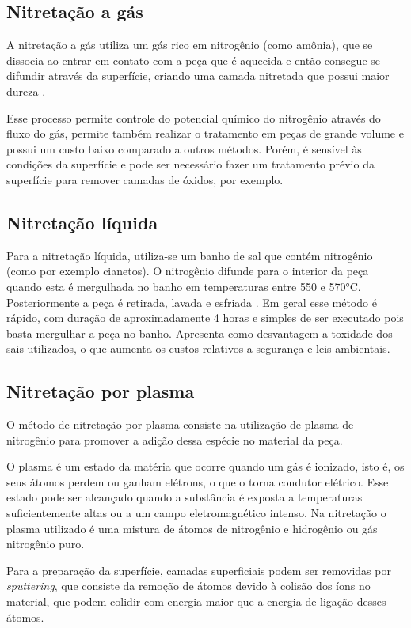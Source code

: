 \documentclass[]{politex}
\begin{document}
\subsection{Nitretação a gás}
	A nitretação a gás utiliza um gás rico em nitrogênio (como amônia), que se dissocia ao entrar em contato com a peça que é aquecida e então consegue se difundir através da superfície, criando uma camada nitretada que possui maior dureza \cite{zimmermannnitretaccao}.   
	
	Esse processo permite controle do potencial químico do nitrogênio através do fluxo do gás, permite também realizar o tratamento em peças de grande volume e possui um custo baixo comparado a outros métodos. Porém, é sensível às condições da superfície e pode ser necessário fazer um tratamento prévio da superfície para remover camadas de óxidos, por exemplo.
	 
\subsection{Nitretação líquida}
	Para a nitretação líquida, utiliza-se um banho de sal que contém nitrogênio (como por exemplo cianetos). O nitrogênio difunde para o interior da peça quando esta é mergulhada no banho em temperaturas entre 550 e 570°C. Posteriormente a peça é retirada, lavada e esfriada \cite{zimmermannnitretaccao}. 
	Em geral esse método é rápido, com duração de aproximadamente 4 horas e simples de ser executado pois basta mergulhar a peça no banho. Apresenta como desvantagem a toxidade dos sais utilizados, o que aumenta os custos relativos a segurança e leis ambientais.
	
\subsection{Nitretação por plasma}
	O método de nitretação por plasma consiste na utilização de plasma de nitrogênio para promover a adição dessa espécie no material da peça. 
	
	O plasma é um estado da matéria que ocorre quando um gás é ionizado, isto é, os seus átomos perdem ou ganham elétrons, o que o torna condutor elétrico. Esse estado pode ser alcançado quando a substância é exposta a temperaturas suficientemente altas ou a um campo eletromagnético intenso. Na nitretação o plasma utilizado é uma mistura de átomos de nitrogênio e hidrogênio ou gás nitrogênio puro.
	
	Para a preparação da superfície, camadas superficiais podem ser removidas por \textit{sputtering}, que consiste da remoção de átomos devido à colisão dos íons no material, que podem colidir com energia maior que a energia de ligação desses átomos.
	
\end{document}
